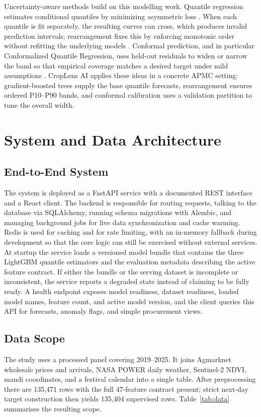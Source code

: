 \documentclass[a4paper,conference]{IEEEtran}
\begin{document}
Uncertainty-aware methods build on this modelling work. Quantile regression estimates conditional quantiles by minimizing asymmetric loss \cite{koenker1978regression}. When each quantile is fit separately, the resulting curves can cross, which produces invalid prediction intervals; rearrangement fixes this by enforcing monotonic order without refitting the underlying models \cite{chernozhukov2010quantile}. Conformal prediction, and in particular Conformalized Quantile Regression, uses held-out residuals to widen or narrow the band so that empirical coverage matches a desired target under mild assumptions \cite{romano2019conformalized,angelopoulos2021gentle}. CropLens AI applies these ideas in a concrete APMC setting: gradient-boosted trees supply the base quantile forecasts, rearrangement ensures ordered P10--P90 bands, and conformal calibration uses a validation partition to tune the overall width.

\section{System and Data Architecture}

\subsection{End-to-End System}
The system is deployed as a FastAPI service with a documented REST interface and a React client. The backend is responsible for routing requests, talking to the database via SQLAlchemy, running schema migrations with Alembic, and managing background jobs for live data synchronization and cache warming. Redis is used for caching and for rate limiting, with an in-memory fallback during development so that the core logic can still be exercised without external services. At startup the service loads a versioned model bundle that contains the three LightGBM quantile estimators and the evaluation metadata describing the active feature contract. If either the bundle or the serving dataset is incomplete or inconsistent, the service reports a degraded state instead of claiming to be fully ready. A health endpoint exposes model readiness, dataset readiness, loaded model names, feature count, and active model version, and the client queries this API for forecasts, anomaly flags, and simple procurement views.

\subsection{Data Scope}
The study uses a processed panel covering 2019--2025. It joins Agmarknet wholesale prices and arrivals, NASA POWER daily weather, Sentinel-2 NDVI, mandi coordinates, and a festival calendar into a single table. After preprocessing there are 135{,}471 rows with the full 47-feature contract present; strict next-day target construction then yields 135{,}404 supervised rows. Table~\ref{tab:data} summarises the resulting scope.
\end{document}
